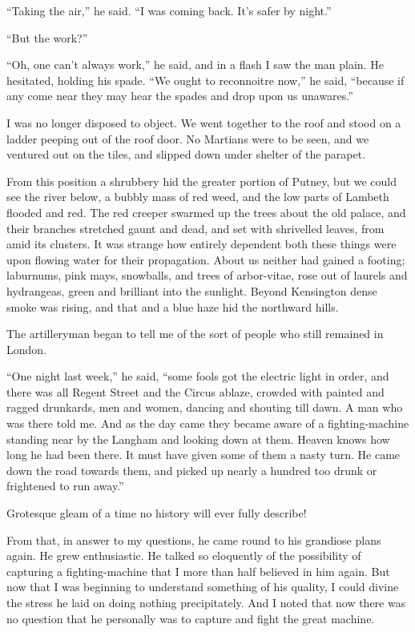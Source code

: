 ``Taking the air,'' he said. ``I was coming back. It's safer by
night.''

``But the work?''

``Oh, one can't always work,'' he said, and in a flash I saw the man
plain. He hesitated, holding his spade. ``We ought to reconnoitre
now,'' he said, ``because if any come near they may hear the spades
and drop upon us unawares.''

I was no longer disposed to object. We went together to the roof
and stood on a ladder peeping out of the roof door. No Martians
were to be seen, and we ventured out on the tiles, and slipped down
under shelter of the parapet.

From this position a shrubbery hid the greater portion of Putney,
but we could see the river below, a bubbly mass of red weed, and
the low parts of Lambeth flooded and red. The red creeper swarmed
up the trees about the old palace, and their branches stretched
gaunt and dead, and set with shrivelled leaves, from amid its
clusters. It was strange how entirely dependent both these things
were upon flowing water for their propagation. About us neither had
gained a footing; laburnums, pink mays, snowballs, and trees of
arbor-vitae, rose out of laurels and hydrangeas, green and
brilliant into the sunlight. Beyond Kensington dense smoke was
rising, and that and a blue haze hid the northward hills.

The artilleryman began to tell me of the sort of people who still
remained in London.

``One night last week,'' he said, ``some fools got the electric light
in order, and there was all Regent Street and the Circus ablaze,
crowded with painted and ragged drunkards, men and women, dancing
and shouting till dawn. A man who was there told me. And as the day
came they became aware of a fighting-machine standing near by the
Langham and looking down at them. Heaven knows how long he had been
there. It must have given some of them a nasty turn. He came down
the road towards them, and picked up nearly a hundred too drunk or
frightened to run away.''

Grotesque gleam of a time no history will ever fully describe!

From that, in answer to my questions, he came round to his
grandiose plans again. He grew enthusiastic. He talked so
eloquently of the possibility of capturing a fighting-machine that
I more than half believed in him again. But now that I was
beginning to understand something of his quality, I could divine
the stress he laid on doing nothing precipitately. And I noted that
now there was no question that he personally was to capture and
fight the great machine.

